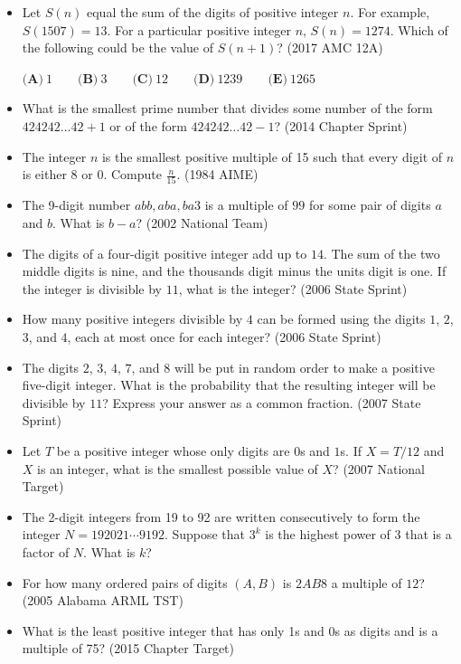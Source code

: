 \documentclass{article}
\begin{document}
\begin{itemize}

\item Let $S(n)$ equal the sum of the digits of positive integer $n$. For example, $S(1507) = 13$. For a particular positive integer $n$, $S(n) = 1274$. Which of the following could be the value of $S(n+1)$? (2017 AMC 12A)

$\textbf{(A)}\ 1 \qquad\textbf{(B)}\ 3\qquad\textbf{(C)}\ 12\qquad\textbf{(D)}\ 1239\qquad\textbf{(E)}\ 1265$

\item What is the smallest prime number that divides some number of the form $424242\ldots 42+1$ or of the form $424242\ldots 42-1$? (2014 Chapter Sprint)


\item The integer $n$ is the smallest positive multiple of 15 such that every digit of $n$ is either $8$ or $0$. Compute $\frac{n}{15}$. (1984 AIME)

\item The 9-digit number $abb,aba,ba3$ is a multiple of $99$ for some pair of digits $a$ and $b$. What is $b-a$? (2002 National Team)

\item The digits of a four-digit positive integer add up to $14$. The sum of the two middle digits is nine, and the thousands digit minus the units digit is one. If the integer is divisible by $11$, what is the integer? (2006 State Sprint)

\item How many positive integers divisible by $4$ can be formed using the digits $1$, $2$, $3$, and $4$, each at most once for each integer? (2006 State Sprint)

\item The digits $2$, $3$, $4$, $7$, and $8$ will be put in random order to make a positive five-digit integer. What is the probability that the resulting integer will be divisible by $11$? Express your answer as a common fraction. (2007 State Sprint)

\item Let $T$ be a positive integer whose only digits are $0$s and $1$s. If $X=T/12$ and $X$ is an integer, what is the smallest possible value of $X$? (2007 National Target)

\item The 2-digit integers from 19 to 92 are written consecutively to form the integer $N=192021\cdots9192$. Suppose that $3^k$ is the highest power of 3 that is a factor of $N$. What is $k$?

\item For how many ordered pairs of digits $(A,B)$ is $2AB8$ a multiple of $12$? (2005 Alabama ARML TST)

\item What is the least positive integer that has only 1s and 0s as digits and is a multiple of 75? (2015 Chapter Target)

\end{itemize}
\end{document}
